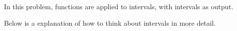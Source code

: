 \documentclass[twocolumn,a4paper]{article}
\begin{document}
In this problem, functions are applied to intervals, with intervals as output. 

\begin{figure}[ht]
	\centering
	\vspace{-10pt}
	\vspace{-10pt}
\end{figure}

Below is a explanation of how to think about intervals in more detail.
\begin{figure}[ht]
	\centering
	\vspace{-10pt}
	\vspace{-30pt}
\end{figure}
\end{document}
